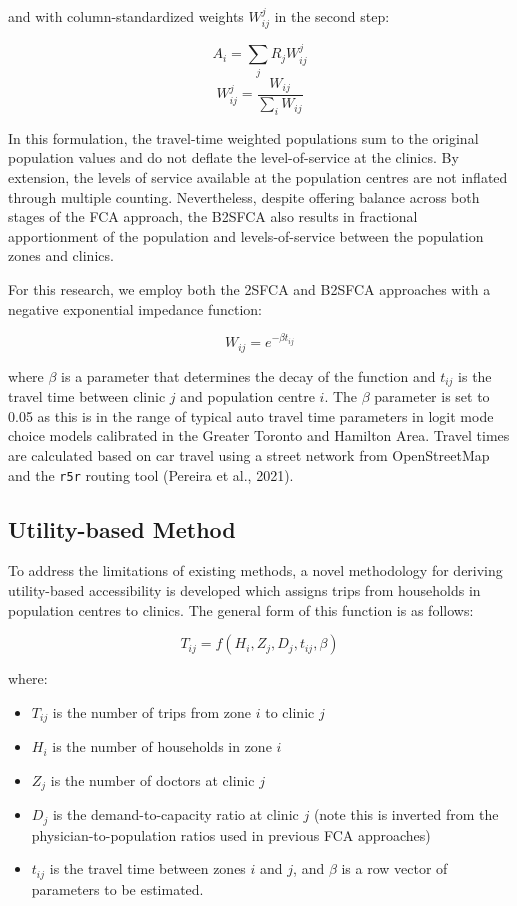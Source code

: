 \documentclass[]{elsarticle} %
\providecommand{\tightlist}{%
  \setlength{\itemsep}{0pt}\setlength{\parskip}{0pt}}
\begin{document}
and with column-standardized weights \(W_{ij}^{j}\) in the second step:

\[
A_i = \sum_j{R_jW_{ij}^{j}}
\] \[
W_{ij}^{j} = \frac{W_{ij}}{\sum_i W_{ij}}
\]

In this formulation, the travel-time weighted populations sum to the
original population values and do not deflate the level-of-service at
the clinics. By extension, the levels of service available at the
population centres are not inflated through multiple counting.
Nevertheless, despite offering balance across both stages of the FCA
approach, the B2SFCA also results in fractional apportionment of the
population and levels-of-service between the population zones and
clinics.

For this research, we employ both the 2SFCA and B2SFCA approaches with a
negative exponential impedance function:

\[
W_{ij} = e^{-\beta t_{ij}}
\]

where \(\beta\) is a parameter that determines the decay of the function
and \(t_{ij}\) is the travel time between clinic \(j\) and population
centre \(i\). The \(\beta\) parameter is set to 0.05 as this is in the
range of typical auto travel time parameters in logit mode choice models
calibrated in the Greater Toronto and Hamilton Area. Travel times are
calculated based on car travel using a street network from OpenStreetMap
and the \texttt{r5r} routing tool (Pereira et al., 2021).

\hypertarget{utility-based-method}{%
\subsection{Utility-based Method}\label{utility-based-method}}

To address the limitations of existing methods, a novel methodology for
deriving utility-based accessibility is developed which assigns trips
from households in population centres to clinics. The general form of
this function is as follows:

\[
T_{ij} = f(H_i, Z_j, D_j, t_{ij}, \beta)
\]

where:

\begin{itemize}
\tightlist
\item
  \(T_{ij}\) is the number of trips from zone \(i\) to clinic \(j\)
\item
  \(H_i\) is the number of households in zone \(i\)
\item
  \(Z_j\) is the number of doctors at clinic \(j\)
\item
  \(D_j\) is the demand-to-capacity ratio at clinic \(j\) (note this is
  inverted from the physician-to-population ratios used in previous FCA
  approaches)
\item
  \(t_{ij}\) is the travel time between zones \(i\) and \(j\), and
  \(\beta\) is a row vector of parameters to be estimated.
\end{itemize}
\end{document}
